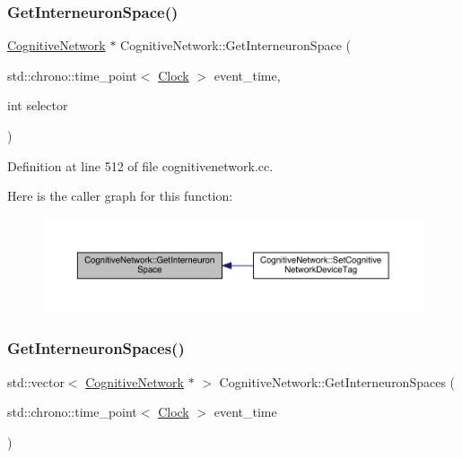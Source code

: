 \mbox{\label{class_cognitive_network_a0119d61e86ea6b84ad7f69f88d59d008}} 
\subsubsection{\texorpdfstring{Get\+Interneuron\+Space()}{GetInterneuronSpace()}}
{\footnotesize\ttfamily \hyperlink{class_cognitive_network}{Cognitive\+Network} $\ast$ Cognitive\+Network\+::\+Get\+Interneuron\+Space (\begin{DoxyParamCaption}\item[{std\+::chrono\+::time\+\_\+point$<$ \hyperlink{universe_8h_a0ef8d951d1ca5ab3cfaf7ab4c7a6fd80}{Clock} $>$}]{event\+\_\+time,  }\item[{int}]{selector }\end{DoxyParamCaption})}



Definition at line 512 of file cognitivenetwork.\+cc.

Here is the caller graph for this function\+:
\nopagebreak
\begin{figure}[H]
\begin{center}
\leavevmode
\includegraphics[width=350pt]{class_cognitive_network_a0119d61e86ea6b84ad7f69f88d59d008_icgraph}
\end{center}
\end{figure}
\mbox{\label{class_cognitive_network_a4daf966882d527b784bd359794ad39ca}} 
\subsubsection{\texorpdfstring{Get\+Interneuron\+Spaces()}{GetInterneuronSpaces()}}
{\footnotesize\ttfamily std\+::vector$<$ \hyperlink{class_cognitive_network}{Cognitive\+Network} $\ast$ $>$ Cognitive\+Network\+::\+Get\+Interneuron\+Spaces (\begin{DoxyParamCaption}\item[{std\+::chrono\+::time\+\_\+point$<$ \hyperlink{universe_8h_a0ef8d951d1ca5ab3cfaf7ab4c7a6fd80}{Clock} $>$}]{event\+\_\+time }\end{DoxyParamCaption})}



